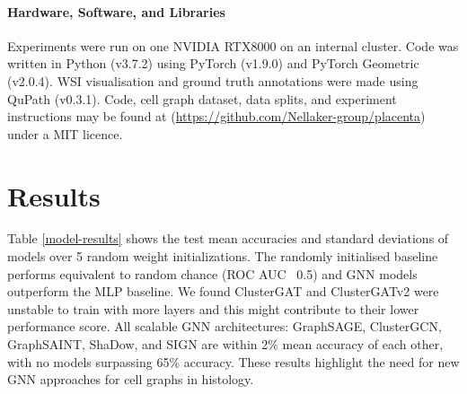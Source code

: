 \documentclass{article}
\begin{document}
\paragraph{Hardware, Software, and Libraries} Experiments were run on one NVIDIA RTX8000 on an internal cluster. Code was written in Python (v3.7.2) using PyTorch (v1.9.0)\cite{paszke_pytorch_2019} and PyTorch Geometric (v2.0.4)\cite{fey_fast_2019}. WSI visualisation and ground truth annotations were made using QuPath (v0.3.1)\cite{peter_bankhead_qupath_2017}. Code, cell graph dataset, data splits, and experiment instructions may be found at (\url{https://github.com/Nellaker-group/placenta}) under a MIT licence.

\label{code}

\section{Results}
\label{results}

Table \ref{model-results} shows the test mean accuracies and standard deviations of models over 5 random weight initializations. The randomly initialised baseline performs equivalent to random chance (ROC AUC ~0.5) and GNN models outperform the MLP baseline. We found ClusterGAT and ClusterGATv2 were unstable to train with more layers and this might contribute to their lower performance score. All scalable GNN architectures: GraphSAGE, ClusterGCN, GraphSAINT, ShaDow, and SIGN are within 2\% mean accuracy of each other, with no models surpassing 65\% accuracy. These results highlight the need for new GNN approaches for cell graphs in histology.
\end{document}
